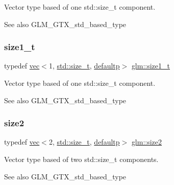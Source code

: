Vector type based of one std\+::size\+\_\+t component. \begin{DoxySeeAlso}{See also}
G\+L\+M\+\_\+\+G\+T\+X\+\_\+std\+\_\+based\+\_\+type 
\end{DoxySeeAlso}
\mbox{\label{group__gtx__std__based__type_ga5bf40bbca3cb66bbd7cc0c389c3c0c56}} 
\subsubsection{\texorpdfstring{size1\+\_\+t}{size1\_t}}
{\footnotesize\ttfamily typedef \hyperlink{structglm_1_1vec}{vec}$<$1, \hyperlink{_s_d_l__config__winrt_8h_a7c94ea6f8948649f8d181ae55911eeaf}{std\+::size\+\_\+t}, \hyperlink{namespaceglm_a36ed105b07c7746804d7fdc7cc90ff25a9d21ccd8b5a009ec7eb7677befc3bf51}{defaultp}$>$ \hyperlink{group__gtx__std__based__type_ga5bf40bbca3cb66bbd7cc0c389c3c0c56}{glm\+::size1\+\_\+t}}

Vector type based of one std\+::size\+\_\+t component. \begin{DoxySeeAlso}{See also}
G\+L\+M\+\_\+\+G\+T\+X\+\_\+std\+\_\+based\+\_\+type 
\end{DoxySeeAlso}
\mbox{\label{group__gtx__std__based__type_ga432937b68775c79e4556150e769c6e6b}} 
\subsubsection{\texorpdfstring{size2}{size2}}
{\footnotesize\ttfamily typedef \hyperlink{structglm_1_1vec}{vec}$<$2, \hyperlink{_s_d_l__config__winrt_8h_a7c94ea6f8948649f8d181ae55911eeaf}{std\+::size\+\_\+t}, \hyperlink{namespaceglm_a36ed105b07c7746804d7fdc7cc90ff25a9d21ccd8b5a009ec7eb7677befc3bf51}{defaultp}$>$ \hyperlink{group__gtx__std__based__type_ga432937b68775c79e4556150e769c6e6b}{glm\+::size2}}

Vector type based of two std\+::size\+\_\+t components. \begin{DoxySeeAlso}{See also}
G\+L\+M\+\_\+\+G\+T\+X\+\_\+std\+\_\+based\+\_\+type 
\end{DoxySeeAlso}
\mbox{\label{group__gtx__std__based__type_ga701549a040be1f2f6f661ddecde337de}} 
